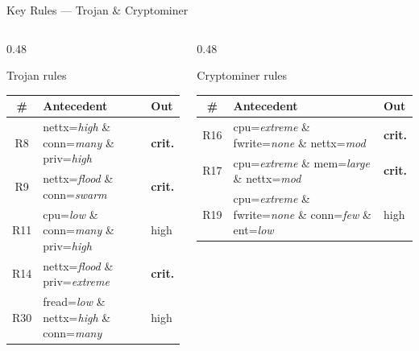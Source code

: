 \documentclass[aspectratio=169,12pt]{beamer}
\begin{document}
\begin{frame}{Key Rules — Trojan \& Cryptominer}
  \begin{columns}[T]
    \begin{column}{0.48\textwidth}
      \begin{block}{Trojan rules}
        \scriptsize
        \setlength{\tabcolsep}{3pt}
        \renewcommand{\arraystretch}{1.1}
        \begin{tabular}{@{} c p{3.8cm} l @{}}
          \toprule
          \# & Antecedent & Out \\
          \midrule
          R8  & nettx=\textit{high} \& conn=\textit{many}
              \& priv=\textit{high}       & \textbf{crit.} \\
          R9  & nettx=\textit{flood} \& conn=\textit{swarm}
                                          & \textbf{crit.} \\
          R11 & cpu=\textit{low} \& conn=\textit{many}
              \& priv=\textit{high}       & high \\
          R14 & nettx=\textit{flood} \& priv=\textit{extreme}
                                          & \textbf{crit.} \\
          R30 & fread=\textit{low} \& nettx=\textit{high}
              \& conn=\textit{many}       & high \\
          \bottomrule
        \end{tabular}
      \end{block}
    \end{column}
    \begin{column}{0.48\textwidth}
      \begin{block}{Cryptominer rules}
        \scriptsize
        \setlength{\tabcolsep}{3pt}
        \renewcommand{\arraystretch}{1.1}
        \begin{tabular}{@{} c p{4.0cm} l @{}}
          \toprule
          \# & Antecedent & Out \\
          \midrule
          R16 & cpu=\textit{extreme} \& fwrite=\textit{none}
              \& nettx=\textit{mod}       & \textbf{crit.} \\
          R17 & cpu=\textit{extreme} \& mem=\textit{large}
              \& nettx=\textit{mod}       & \textbf{crit.} \\
          R19 & cpu=\textit{extreme} \& fwrite=\textit{none}
              \& conn=\textit{few} \& ent=\textit{low} & high \\

\end{tabular}
\end{block}
\end{column}
\end{columns}
\end{frame}
\end{document}
